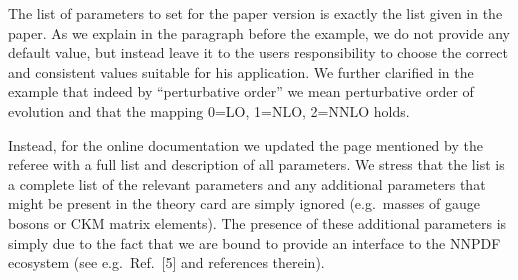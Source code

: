 \documentclass[a4paper,11pt]{article}
\begin{document}
\begin{response}
The list of parameters to set for the paper version is exactly the list given in the paper. As we explain in the paragraph
before the example, we do not provide any default value, but instead leave it to the users responsibility to choose
the correct and consistent values suitable for his application. We further clarified in the example that indeed by
\enquote{perturbative order} we mean perturbative order of evolution and that the mapping 0=LO, 1=NLO, 2=NNLO holds.

Instead, for the online documentation we updated the page mentioned by the referee with a full list and description of
all parameters. We stress that the list is a complete list of the relevant parameters and any additional parameters
that might be present in the theory card are simply ignored (e.g.\ masses of gauge bosons or CKM matrix elements).
The presence of these additional parameters is simply due to the fact that we are bound to provide an interface to the
NNPDF ecosystem (see e.g.\ Ref.~[5] and references therein).

\end{response}

% 
% 

\end{document}
